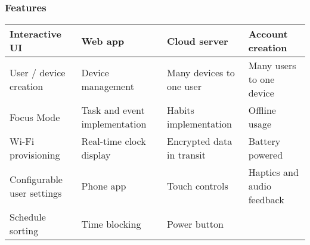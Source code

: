 \documentclass{beamer}
\begin{document}
\begin{frame}
  \frametitle{Features}
  \begin{table}
    \centering
    \small
    \begin{tabular}{|p{}|p{}|p{}|p{}|}
      \hline
      \cellcolor[HTML]{CFE2F3}Interactive UI           & \cellcolor[HTML]{CFE2F3}Web app                       & \cellcolor[HTML]{CFE2F3}Cloud server               & \cellcolor[HTML]{CFE2F3}Account creation         \\ \hline
      \cellcolor[HTML]{CFE2F3}User / device creation   & \cellcolor[HTML]{CFE2F3}Device management             & \cellcolor[HTML]{CFE2F3}Many devices to one user   & \cellcolor[HTML]{CFE2F3}Many users to one device \\ \hline
      \cellcolor[HTML]{CFE2F3}Focus Mode               & \cellcolor[HTML]{CFE2F3}Task and event implementation & \cellcolor[HTML]{CFE2F3}Habits implementation      & \cellcolor[HTML]{CFE2F3}Offline usage            \\ \hline
      \cellcolor[HTML]{CFE2F3}Wi-Fi provisioning       & \cellcolor[HTML]{CFE2F3}Real-time clock display       & \cellcolor[HTML]{CFE2F3} Encrypted data in transit & Battery powered                                  \\ \hline
      Configurable user settings                       & Phone app                                             & Touch controls                                     & Haptics and audio feedback                       \\ \hline
      Schedule sorting                                 & Time blocking                                         & Power button                                       &                                                  \\ \hline
    \end{tabular}
  \end{table}

  \renewcommand{\thefootnote}{\roman{footnote}}
\end{frame}
\end{document}
